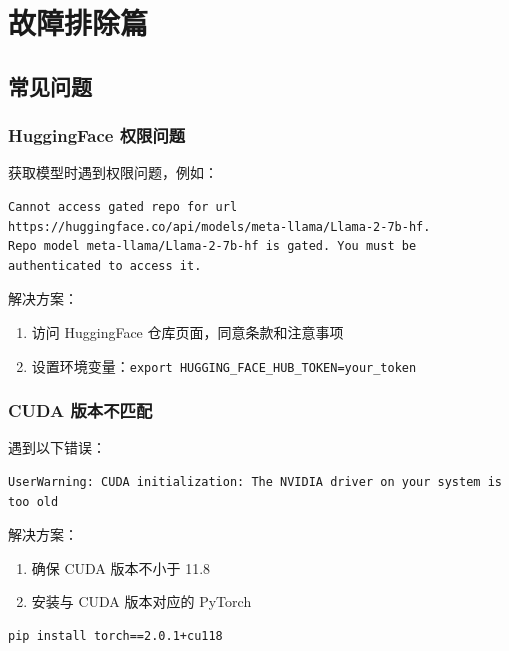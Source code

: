 \documentclass[12pt,UTF8]{ctexbook}
\begin{document}
\part{故障排除篇}

\chapter{常见问题}
\label{chap:troubleshooting}

\section{HuggingFace 权限问题}
\label{sec:huggingface_auth}

获取模型时遇到权限问题，例如：

\begin{lstlisting}
Cannot access gated repo for url https://huggingface.co/api/models/meta-llama/Llama-2-7b-hf.
Repo model meta-llama/Llama-2-7b-hf is gated. You must be authenticated to access it.
\end{lstlisting}

解决方案：
\begin{enumerate}[leftmargin=2cm]
    \item 访问 HuggingFace 仓库页面，同意条款和注意事项
    \item 设置环境变量：\texttt{export HUGGING\_FACE\_HUB\_TOKEN=your\_token}
\end{enumerate}

\section{CUDA 版本不匹配}
\label{sec:cuda_version}

遇到以下错误：

\begin{lstlisting}
UserWarning: CUDA initialization: The NVIDIA driver on your system is too old
\end{lstlisting}

解决方案：
\begin{enumerate}[leftmargin=2cm]
    \item 确保 CUDA 版本不小于 11.8
    \item 安装与 CUDA 版本对应的 PyTorch
\end{enumerate}

\begin{lstlisting}
pip install torch==2.0.1+cu118
\end{lstlisting}
\end{document}
